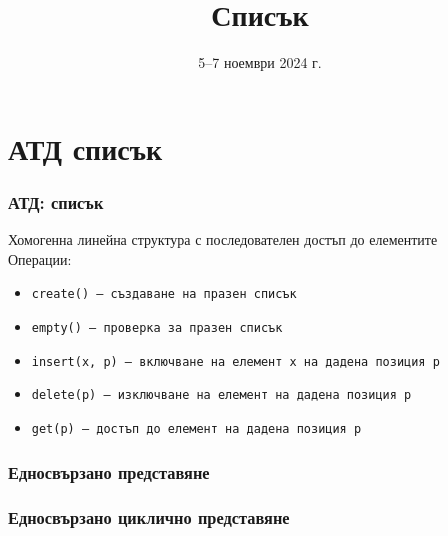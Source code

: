 \documentclass[alsotrans,beameroptions={aspectratio=169}]{beamerswitch}
\title{Списък}
\date{5–7 ноември 2024 г.}
\newcommand{\linkedchain}{
  \doublecell{a1}{a_1}
  \nextdoublecell{a2}{a_2}{a1}
  \nextdots{a2}
  \dotsnextdoublecell{an-1}{a_{n-1}}
  \nextdoublecell{an}{a_n}{an-1}
}
\begin{document}
\begin{frame}
  \titlepage
\end{frame}

\section{АТД списък}

\begin{frame}
  \frametitle{АТД: списък}

  Хомогенна линейна структура с последователен достъп до елементите\\[2ex]
  Операции:\\[1ex]
  \begin{itemize}
  \item \tt{create()} --- създаване на празен списък
  \item \tt{empty()} --- проверка за празен списък
  \item \tt{insert(x, p)} --- включване на елемент \tt x на дадена позиция \tt p
  \item \tt{delete(p)} --- изключване на елемент на дадена позиция \tt p
  \item \tt{get(p)} --- достъп до елемент на дадена позиция \tt p
  \end{itemize}
\end{frame}

\begin{frame}
  \frametitle{Едносвързано представяне}

  \begin{center}
  \end{center}
\end{frame}

\begin{frame}
  \frametitle{Едносвързано циклично представяне}

  \begin{center}
    \small
  \end{center}
\end{frame}
\end{document}
